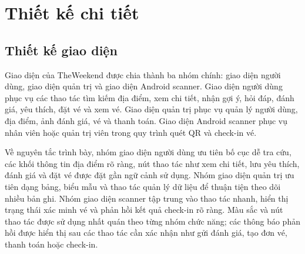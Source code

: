 ﻿\documentclass[../DoAn.tex]{subfiles}
\begin{document}
\section{Thiết kế chi tiết}

\subsection{Thiết kế giao diện}

Giao diện của TheWeekend được chia thành ba nhóm chính: giao diện người dùng, giao diện quản trị và giao diện Android scanner. Giao diện người dùng phục vụ các thao tác tìm kiếm địa điểm, xem chi tiết, nhận gợi ý, hỏi đáp, đánh giá, yêu thích, đặt vé và xem vé. Giao diện quản trị phục vụ quản lý người dùng, địa điểm, ảnh đánh giá, vé và thanh toán. Giao diện Android scanner phục vụ nhân viên hoặc quản trị viên trong quy trình quét QR và check-in vé.

Về nguyên tắc trình bày, nhóm giao diện người dùng ưu tiên bố cục dễ tra cứu, các khối thông tin địa điểm rõ ràng, nút thao tác như xem chi tiết, lưu yêu thích, đánh giá và đặt vé được đặt gần ngữ cảnh sử dụng. Nhóm giao diện quản trị ưu tiên dạng bảng, biểu mẫu và thao tác quản lý dữ liệu để thuận tiện theo dõi nhiều bản ghi. Nhóm giao diện scanner tập trung vào thao tác nhanh, hiển thị trạng thái xác minh vé và phản hồi kết quả check-in rõ ràng. Màu sắc và nút thao tác được sử dụng nhất quán theo từng nhóm chức năng; các thông báo phản hồi được hiển thị sau các thao tác cần xác nhận như gửi đánh giá, tạo đơn vé, thanh toán hoặc check-in.
\end{document}
